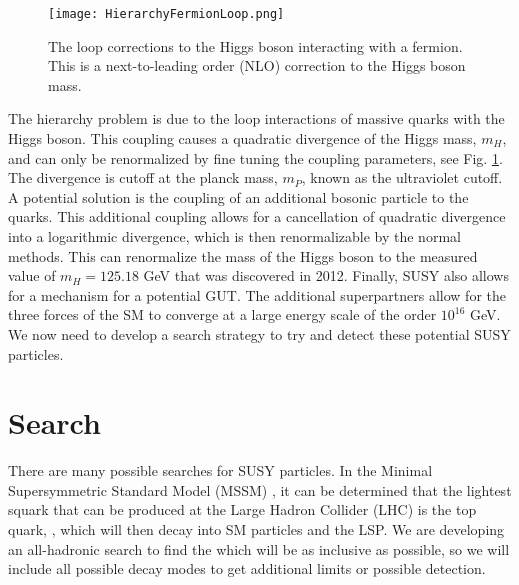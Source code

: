 \begin{figure}
 	\centering
	\texttt{[image: HierarchyFermionLoop.png]}
 	\caption[Hierarchy Fermion Loop]{The loop corrections to the Higgs boson interacting with a fermion. This is a next-to-leading order (NLO) correction to the Higgs boson mass.}
 	\label{HierarchyFermion} 
\end{figure}

The hierarchy problem is due to the loop interactions of massive quarks with the Higgs boson. This coupling causes a quadratic divergence of the Higgs mass, $m_H$, and can only be renormalized by fine tuning the coupling parameters, see Fig. \ref{HierarchyFermion}. The divergence is cutoff at the planck mass, $m_P$, known as the ultraviolet cutoff. A potential solution is the coupling of an additional bosonic particle to the quarks. This additional coupling allows for a cancellation of quadratic divergence into a logarithmic divergence, which is then renormalizable by the normal methods. This can renormalize the mass of the Higgs boson to the measured value of $m_H=125.18$ GeV \cite{chatrchyan_observation_2012, aad_observation_2012, chatrchyan_observation_2013, atlas_collaboration_combined_2015} that was discovered in 2012. Finally, SUSY also allows for a mechanism for a potential GUT. The additional superpartners allow for the three forces of the SM to converge at a large energy scale of the order $10^{16}$ GeV. We now need to develop a search strategy to try and detect these potential SUSY particles.

\section{Search}
\label{sec:search}

There are many possible searches for SUSY particles. In the Minimal Supersymmetric Standard Model (MSSM) \cite{martin_supersymmetry_1997}, it can be determined that the lightest squark that can be produced at the Large Hadron Collider (LHC) is the top quark, \st{}, which will then decay into SM particles and the LSP.  We are developing an all-hadronic search to find the \st{} which will be as inclusive as possible, so we will include all possible decay modes to get additional limits or possible detection. 

